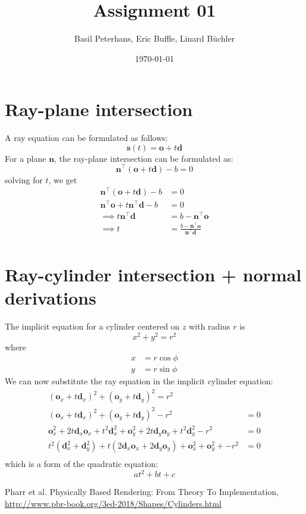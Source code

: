 \documentclass[a4paper, 12pt]{article}
\begin{document}
	\setlength{\parindent}{0cm}
	\renewcommand{\baselinestretch}{0.5}
	\title{Assignment 01}
	\author{Basil Peterhans, Eric Buffle, Linard Büchler}
	\date{\today}
	\maketitle
	\tableofcontents{}
\section{Ray-plane intersection}
A ray equation can be formulated as follows:
$$
\textbf{s}(t) = \textbf{o}+ t\textbf{d}
$$
For a plane $\textbf{n}$, the ray-plane intersection can be formulated as:
$$
\textbf{n}^\top (\textbf{o}+ t\textbf{d})- b = 0
$$
solving for $t$, we get
\begin{align*}
\textbf{n}^\top (\textbf{o}+ t\textbf{d})- b &= 0\\
\textbf{n}^\top\textbf{o} + t\textbf{n}^\top\textbf{d} - b &=0\\
\implies t\textbf{n}^\top\textbf{d} &=b - \textbf{n}^\top\textbf{o}\\
\implies t &=\frac{b - \textbf{n}^\top\textbf{o}}{\textbf{n}^\top\textbf{d}} \\
\end{align*}
\section{Ray-cylinder intersection + normal derivations}
The implicit equation for a cylinder centered on $z$ with radius $r$ is
$$
x^2 + y^2 = r^2
$$
where
\begin{align*}
  x&=r\cos\phi\\
  y&=r\sin\phi
\end{align*}
We can now substitute the ray equation in the implicit cylinder equation:
\begin{align*}
(\textbf{o}_x+ t\textbf{d}_x)^2 + (\textbf{o}_y+ t\textbf{d}_y)^2 = r^2\\
(\textbf{o}_x+ t\textbf{d}_x)^2 + (\textbf{o}_y+ t\textbf{d}_y)^2 -  r^2 &= 0\\
\textbf{o}_x^2 + 2t\textbf{d}_x\textbf{o}_x + t^2\textbf{d}_x^2 + \textbf{o}_y^2 + 2t\textbf{d}_y\textbf{o}_y + t^2\textbf{d}_y^2-  r^2 &= 0\\
t^2(\textbf{d}_x^2 + \textbf{d}_y^2) + t(2\textbf{d}_x\textbf{o}_x + 2\textbf{d}_y\textbf{o}_y) + \textbf{o}_x^2  + \textbf{o}_y^2 +  - r^2 &= 0\\
\end{align*}
which is a form of the quadratic equation:
$$
at^2 + bt + c
$$
\begin{thebibliography}{10} %
   Pharr et al. Physically Based Rendering:
  From Theory To Implementation, \url{http://www.pbr-book.org/3ed-2018/Shapes/Cylinders.html}%
%
%
%

\end{thebibliography}
\end{document}
